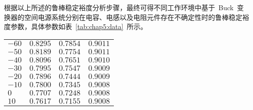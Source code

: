 根据以上所述的鲁棒稳定裕度分析步骤，最终可得不同工作环境中基于~Buck~变换器的空间电源系统分别在电容、电感以及电阻元件存在不确定性时的鲁棒稳定裕度参数，具体参数如表~\ref{tab:chap5:data}~所示。
\newpage
\begin{center} 

\tablelasttail{\bottomrule}
\begin{supertabular}{C{3cm}C{3cm}C{3cm}C{3cm}}
 \midrule
        $-60$                      & $0.8295$              & $0.7854$             & $0.9011$       \\ 

        $-50$                      & $0.8189$              & $0.7754$             & $0.9011$       \\ 

        $-40$                      & $0.8096$              & $0.7651$             & $0.9010$       \\ 

        $-30$                      & $0.7995$              & $0.7547$             & $0.9009$       \\ 

        $-20$                      & $0.7896$              & $0.7444$             & $0.9009$       \\ 

        $-10$                      & $0.7800$              & $0.7345$             & $0.9008$       \\ 

        $0$                         & $0.7707$              & $0.7248$             & $0.9008$       \\  

        $10$                      & $0.7617$              & $0.7155$             & $0.9008$        \\  


\end{supertabular}
\end{center}

